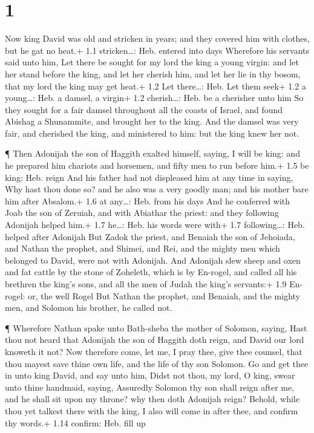 \hypertarget{section}{%
\section{1}\label{section}}

 Now king David was old and stricken in years; and they
covered him with clothes, but he gat no heat.+ 1.1 stricken\ldots: Heb.
entered into days  Wherefore his servants said unto him, Let
there be sought for my lord the king a young virgin: and let her stand
before the king, and let her cherish him, and let her lie in thy bosom,
that my lord the king may get heat.+ 1.2 Let there\ldots: Heb. Let them
seek+ 1.2 a young\ldots: Heb. a damsel, a virgin+ 1.2 cherish\ldots:
Heb. be a cherisher unto him  So they sought for a fair
damsel throughout all the coasts of Israel, and found Abishag a
Shunammite, and brought her to the king.  And the damsel was
very fair, and cherished the king, and ministered to him: but the king
knew her not.

 ¶ Then Adonijah the son of Haggith exalted himself, saying,
I will be king: and he prepared him chariots and horsemen, and fifty men
to run before him.+ 1.5 be king: Heb. reign  And his father
had not displeased him at any time in saying, Why hast thou done so? and
he also was a very goodly man; and his mother bare him after Absalom.+
1.6 at any\ldots: Heb. from his days  And he conferred with
Joab the son of Zeruiah, and with Abiathar the priest: and they
following Adonijah helped him.+ 1.7 he\ldots: Heb. his words were with+
1.7 following\ldots: Heb. helped after Adonijah  But Zadok
the priest, and Benaiah the son of Jehoiada, and Nathan the prophet, and
Shimei, and Rei, and the mighty men which belonged to David, were not
with Adonijah.  And Adonijah slew sheep and oxen and fat
cattle by the stone of Zoheleth, which is by En-rogel, and called all
his brethren the king's sons, and all the men of Judah the king's
servants:+ 1.9 En-rogel: or, the well Rogel  But Nathan the
prophet, and Benaiah, and the mighty men, and Solomon his brother, he
called not.

 ¶ Wherefore Nathan spake unto Bath-sheba the mother of
Solomon, saying, Hast thou not heard that Adonijah the son of Haggith
doth reign, and David our lord knoweth it not?  Now
therefore come, let me, I pray thee, give thee counsel, that thou mayest
save thine own life, and the life of thy son Solomon.  Go
and get thee in unto king David, and say unto him, Didst not thou, my
lord, O king, swear unto thine handmaid, saying, Assuredly Solomon thy
son shall reign after me, and he shall sit upon my throne? why then doth
Adonijah reign?  Behold, while thou yet talkest there with
the king, I also will come in after thee, and confirm thy words.+ 1.14
confirm: Heb. fill up

